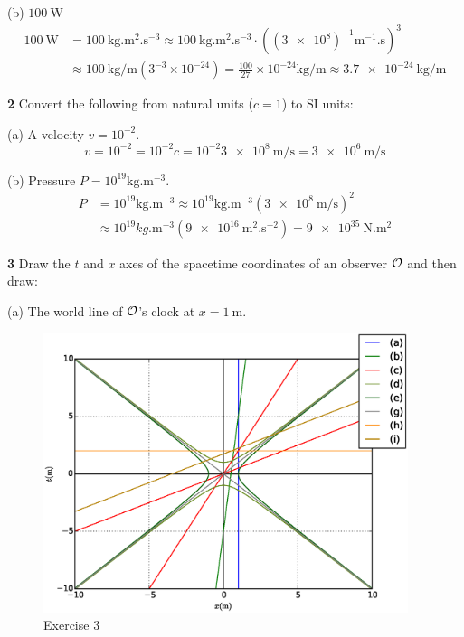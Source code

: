 \documentclass[gr-notes.tex]{subfiles}
\begin{document}
(b) $\SI{100}{\watt}$
\begin{align*}
  \SI{100}{\watt} &=
  \SI{100}{\kilogram.\meter^2.\second^{-3}} \approx
  \SI{100}{\kilogram.\meter^2.\second^{-3}} \cdot
  ((\num{3e8})^{-1} \si{\meter^{-1}.\second})^3
  \\ &\approx
  \SI{100}{\kilogram\per\meter} (3^{-3} \times 10^{-24}) =
  \frac{100}{27} \times 10^{-24} \si{\kilogram\per\meter} \approx
  \SI{3.7e-24}{\kilogram\per\meter}
\end{align*}


\textbf{2}
Convert the following from natural units ($c = 1$) to SI units:

(a) A velocity $v = 10^{-2}$.
\begin{displaymath}
  v = 10^{-2} =
  10^{-2} c =
  10^{-2} \SI{3e8}{\meter\per\second} =
  \SI{3e6}{\meter\per\second}
\end{displaymath}

(b) Pressure $P = 10^{19} \si{\kilogram.\meter^{-3}}$.
\begin{align*}
  P &=
  10^{19} \si{\kilogram.\meter^{-3}} \approx
  10^{19} \si{\kilogram.\meter^{-3}} (\SI{3e8}{\meter\per\second})^2
  \\ &\approx
  10^{19} \si{kg.\meter^{-3}} (\SI{9e16}{\meter^2.\second^{-2}}) =
  \SI{9e35}{\newton.\meter^2}
\end{align*}


\textbf{3}
Draw the $t$ and $x$ axes of the spacetime coordinates of an observer $\mathcal{O}$ and then draw:

(a) The world line of $\mathcal{O}$'s clock at $x = \SI{1}{\meter}$.

\begin{figure}[h]
  \centering
  \includegraphics[width=0.95\textwidth]{img/problem_3}

  \caption*{Exercise 3}
\end{figure}
\end{document}
